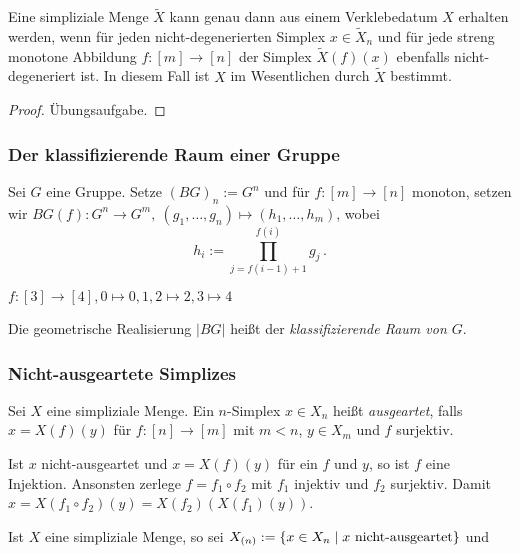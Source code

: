 \begin{prop}
  Eine simpliziale Menge $\tilde X$ kann genau dann aus einem Verklebedatum $X$
  erhalten werden, wenn für jeden nicht-degenerierten Simplex $x \in \tilde
  X_n$ und für jede streng monotone Abbildung $f:[m]\to [n]$ der Simplex
  $\tilde X(f)(x)$ ebenfalls nicht-degeneriert ist. In diesem Fall ist $X$ im
  Wesentlichen durch $\tilde X$ bestimmt.
\end{prop}
\begin{proof}
  Übungsaufgabe.
\end{proof}

\subsubsection{Der klassifizierende Raum einer Gruppe}
Sei $G$ eine Gruppe. Setze $(BG)_n := G^n$ und für $f:[m]\to[n]$ monoton,
setzen wir $BG(f): G^n\to G^m,\ (g_1,\ldots,g_n)\mapsto (h_1,\ldots,h_m)$,
wobei
\[ h_i := \prod_{j = f(i-1)+1}^{f(i)} g_j\,.\]


\begin{beispiel}
  $f: [3]\to[4], 0\mapsto 0, 1,2\mapsto 2, 3\mapsto 4$ 
  \Bild
\end{beispiel}

\begin{definition}
  Die geometrische Realisierung $|BG|$ heißt der \emph{klassifizierende Raum
  von $G$}.
\end{definition}


\subsubsection{Nicht-ausgeartete Simplizes}
\label{subsub:nicht_ausgeartet}
\begin{definition}
  Sei $X$ eine simpliziale Menge. Ein $n$-Simplex $x \in X_n$ heißt 
  \emph{ausgeartet}, falls $x = X(f)(y)$ für $f:[n]\to[m]$ mit $m<n$,
  $y\in X_m$ und $f$ surjektiv.
\end{definition}

\begin{bem}
  Ist $x$ nicht-ausgeartet und $x = X(f)(y)$ für ein $f$ und $y$, so ist
  $f$ eine Injektion. Ansonsten zerlege $f = f_1\circ f_2$ mit $f_1$ injektiv
  und $f_2$ surjektiv. Damit $x = X(f_1\circ f_2)(y) = X(f_2)(X(f_1)(y))$.
\end{bem}

Ist $X$ eine simpliziale Menge, so sei 
$X_{(n)} := \{ x\in X_n \mid x\text{ nicht-ausgeartet}\}$ und
\begin{center}
\end{center}

